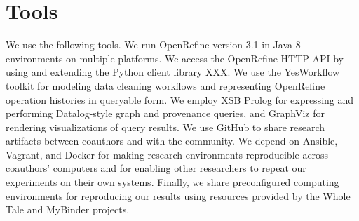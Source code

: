 \section{Tools}

We use the following tools. We run OpenRefine version 3.1 in Java 8 environments on multiple platforms. We access the OpenRefine HTTP API by using and extending the Python client library XXX. We use the YesWorkflow toolkit for modeling data cleaning workflows and representing OpenRefine operation histories in queryable form. We employ XSB Prolog for expressing and performing Datalog-style graph and provenance queries, and GraphViz for rendering visualizations of query results. We use GitHub to share research artifacts between coauthors and with the community. We depend on Ansible, Vagrant, and Docker for making research environments reproducible across coauthors' computers and for enabling other researchers to repeat our experiments on their own systems. Finally, we share preconfigured computing environments for reproducing our results using resources provided by the Whole Tale and MyBinder projects.

